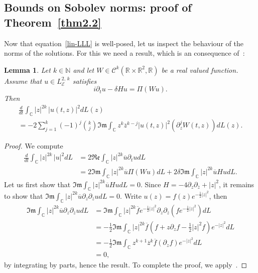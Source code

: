 \documentclass[10pt]{amsart}
\newtheorem{lemm}[theo]{Lemma}\newtheorem{prop}[theo]{Proposition}\newtheorem{coro}[theo]{Corollary}\newtheorem{conj}[theo]{Conjecture}
\theoremstyle{definition}\newtheorem{defi}[theo]{Definition}\newtheorem{rema}[theo]{Remark}\newtheorem{exam}[theo]{Example}\newtheorem{exem}[theo]{Example}\newtheorem{nota}[theo]{Notation}
\newcommand{\C}{\mathbb{C}}
\newcommand{\R}{\mathbb{R}}
\newcommand{\N}{\mathbb{N}}
\newcommand{\E}{\mathcal{E}}
\newcommand{\clC}{\mathcal{C}}
\newcommand{\fkIm}{\mathfrak{Im}}
\newcommand{\fkRe}{\mathfrak{Re}}
\newcommand{\ov}{\overline}
\newcommand{\<}{\langle}
\renewcommand{\>}{\rangle}
\begin{document}
\subsection{Bounds on Sobolev norms: proof of Theorem~\ref{thm2.2}}

Now that equation~\eqref{lin-LLL} is well-posed, let us inspect the behaviour of the norms of the solutions. For this we need a result, which is an consequence of~\cite[Lemma~2.1]{Schw-Tho}:



\begin{lemm}
Let $k \in \N$ and let $W \in \clC^k(\R \times \R^2, \R)$ be a real valued function. Assume that $u\in L^{2,\,k}_\E$ satisfies
\[
i \partial_t u- \delta Hu=\Pi \left(W u\right).
\]
Then
\begin{multline}\label{form-deri0}
\frac{d}{dt}\int_{\C}|z|^{2k}\,|u(t,z)|^2dL(z)\\
= -2\sum_{j=1}^k(-1)^j\binom{{k}}{{j}}\fkIm \int_{\C} z^k \ov{z}^{k-j} |u(t,z)|^2 \left(\partial_z^j W(t,z)\right)dL(z).
\end{multline}
\end{lemm}

\begin{proof}
We compute
\begin{align*}
\frac{d}{dt}\int_{\C}|z|^{2k}\,|u|^2dL&= 2\fkRe \int_{\C} |z|^{2k} \ov{u}\partial_t u dL\\
&= 2\fkIm \int_{\C} |z|^{2k} \ov{u}\Pi(Wu) dL+2\delta \fkIm \int_{\C} |z|^{2k} \ov{u}Hu dL.
\end{align*}
Let us first show that $\fkIm \int_{\C} |z|^{2k} \ov{u}Hu dL=0$. Since $H = -4\partial_z \partial_{\ov z}+|z|^2$, it remains to show that $ \fkIm \int_{\C} |z|^{2k} \ov{u} \partial_z \partial_{\ov z}u dL=0$. Write $u(z)=f(z)e^{-\frac12|z|^2}$, then
\begin{align*}
\fkIm \int_{\C} |z|^{2k} \ov{u} \partial_z \partial_{\ov z}u dL&= \fkIm \int_{\C} |z|^{2k} \ov{f}e^{-\frac12|z|^2} \partial_z
\partial_{\ov z}\left(fe^{-\frac12|z|^2}\right)dL\\
&= -\frac12 \fkIm \int_{\C} |z|^{2k} \ov{f} \left(f+z\partial_zf-\frac12 |z|^2f\right)e^{-|z|^2}dL\\
&= -\frac12 \fkIm \int_{\C} z^{k+1}\ov{z}^k \ov{f} \left(\partial_zf\right) e^{-|z|^2}dL\\
&=0,
\end{align*}
by integrating by parts, hence the result. To complete the proof, we apply~\cite[Lemma~2.1]{Schw-Tho}.
\end{proof}
\end{document}
